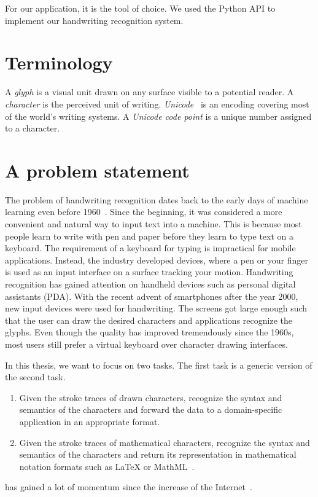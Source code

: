 For our application, it is the tool of choice.
We used the Python API to implement our handwriting recognition system.

\section{Terminology}
\label{sec:nn-terminology}
%
A \emph{glyph} is a visual unit drawn on any surface visible to a potential reader.
A \emph{character} is the perceived unit of writing.
\emph{Unicode}~\cite{unicode} is an encoding covering most of the world's writing systems.
A \emph{Unicode code point} is a unique number assigned to a character.

\section{A problem statement}
\label{sec:problem-statement}
%
The problem of handwriting recognition dates back to the early days of machine learning even before 1960~\cite{5244320}.
Since the beginning, it was considered a more convenient and natural way to input text into a machine.
This is because most people learn to write with pen and paper before they learn to type text on a keyboard.
The requirement of a keyboard for typing is impractical for mobile applications.
Instead, the industry developed devices, where a pen or your finger is used as an input interface on a surface tracking your motion.
Handwriting recognition has gained attention on handheld devices such as personal digital assistants (PDA).
With the recent advent of smartphones after the year 2000, new input devices were used for handwriting.
The screens got large enough such that the user can draw the desired characters and applications recognize the glyphs.
Even though the quality has improved tremendously since the 1960s, most users still prefer a virtual keyboard over character drawing interfaces.

In this thesis, we want to focus on two tasks. The first task is a generic version of the second task.
\begin{enumerate}
  \item Given the stroke traces of drawn characters, recognize the syntax and semantics of the characters and forward the data to a domain-specific application in an appropriate format.
  \item Given the stroke traces of mathematical characters, recognize the syntax and semantics of the characters and return its representation in mathematical notation formats such as \LaTeX{} or MathML~\cite{MathML}.
\end{enumerate}
has gained a lot of momentum since the increase of the Internet~\cite{chan2000mathematical}.



